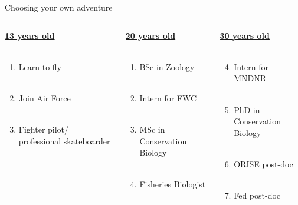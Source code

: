 \documentclass[serif]{beamer}\usepackage[]{graphicx}\usepackage[]{color}
\begin{document}
\begin{frame}{Choosing your own adventure}
\begin{columns}[t]
\begin{column}{0.35\textwidth}
\underline{\textbf{13 years old}}\\~\\
\begin{enumerate}
\item Learn to fly \\~\\
\item Join Air Force \\~\\
\item Fighter pilot/ professional skateboarder
\end{enumerate}
\end{column}
\begin{column}{0.35\textwidth}
\underline{\textbf{20 years old}}\\~\\
\begin{enumerate}
\item BSc in Zoology \\~\\
\item Intern for FWC \\~\\
\item MSc in Conservation Biology \\~\\
\item Fisheries Biologist
\end{enumerate}
\end{column}
\begin{column}{0.35\textwidth}
\underline{\textbf{30 years old}}\\~\\
\begin{enumerate}
\setcounter{enumi}{3}
\item Intern for MNDNR \\~\\
\item PhD in Conservation Biology \\~\\
\item ORISE post-doc \\~\\
\item Fed post-doc \\~\\
\end{enumerate}
\end{column}
\end{columns}
\end{frame}
\end{document}
